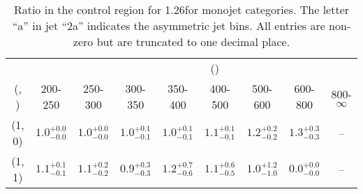 \begin{table}[h!]
\tiny
\centering
\caption{Ratio in the \mj control region for 1.26\ifb for monojet categories. The letter ``a'' in jet \eg ``2a''  indicates the asymmetric jet bins. All entries are non-zero but are truncated to one decimal place.\label{tab:ratiosep_mu_ewk_mono}}
\begin{tabular}
{ccccccccc}
	\hline\hline
&	& \multicolumn{8}{c}{\scalht (\gev)} \\ 
	 (\njet,  \nb) & 200-250 & 250-300 & 300-350 & 350-400 & 400-500 & 500-600 & 600-800 & 800-$\infty$ \\ [0.8ex] 
\hline
	(1, 0) & $1.0^{+ 0.0 }_{- 0.0 }$ & $1.0^{+ 0.0 }_{- 0.0 }$ & $1.0^{+ 0.1 }_{- 0.1 }$ & $1.0^{+ 0.1 }_{- 0.1 }$ & $1.1^{+ 0.1 }_{- 0.1 }$ & $1.2^{+ 0.2 }_{- 0.2 }$ & $1.3^{+ 0.3 }_{- 0.3 }$ & -- \\[0.5ex] 
	(1, 1) & $1.1^{+ 0.1 }_{- 0.1 }$ & $1.1^{+ 0.2 }_{- 0.2 }$ & $0.9^{+ 0.3 }_{- 0.3 }$ & $1.2^{+ 0.7 }_{- 0.6 }$ & $1.1^{+ 0.6 }_{- 0.5 }$ & $1.0^{+ 1.2 }_{- 1.0 }$ & $0.0^{+ 0.0 }_{- 0.0 }$ & -- \\[0.5ex] 
	\hline
	\hline
\end{tabular}
\end{table}
